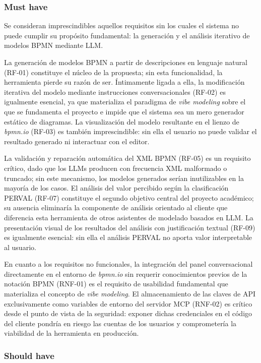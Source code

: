 {\subsubsection*{Must have}

Se consideran imprescindibles aquellos requisitos sin los cuales el sistema no puede cumplir su propósito fundamental: la generación y el análisis iterativo de modelos BPMN mediante LLM.

La generación de modelos BPMN a partir de descripciones en lenguaje natural (RF-01) constituye el núcleo de la propuesta; sin esta funcionalidad, la herramienta pierde su razón de ser. Íntimamente ligada a ella, la modificación iterativa del modelo mediante instrucciones conversacionales (RF-02) es igualmente esencial, ya que materializa el paradigma de \textit{vibe modeling} sobre el que se fundamenta el proyecto e impide que el sistema sea un mero generador estático de diagramas. La visualización del modelo resultante en el lienzo de \textit{bpmn.io} (RF-03) es también imprescindible: sin ella el usuario no puede validar el resultado generado ni interactuar con el editor.

La validación y reparación automática del XML BPMN (RF-05) es un requisito crítico, dado que los LLMs producen con frecuencia XML malformado o truncado; sin este mecanismo, los modelos generados serían inutilizables en la mayoría de los casos. El análisis del valor percibido según la clasificación PERVAL (RF-07) constituye el segundo objetivo central del proyecto académico; su ausencia eliminaría la componente de análisis orientado al cliente que diferencia esta herramienta de otros asistentes de modelado basados en LLM. La presentación visual de los resultados del análisis con justificación textual (RF-09) es igualmente esencial: sin ella el análisis PERVAL no aporta valor interpretable al usuario.

En cuanto a los requisitos no funcionales, la integración del panel conversacional directamente en el entorno de \textit{bpmn.io} sin requerir conocimientos previos de la notación BPMN (RNF-01) es el requisito de usabilidad fundamental que materializa el concepto de \textit{vibe modeling}. El almacenamiento de las claves de API exclusivamente como variables de entorno del servidor MCP (RNF-02) es crítico desde el punto de vista de la seguridad: exponer dichas credenciales en el código del cliente pondría en riesgo las cuentas de los usuarios y comprometería la viabilidad de la herramienta en producción.

\subsubsection*{Should have}

}
